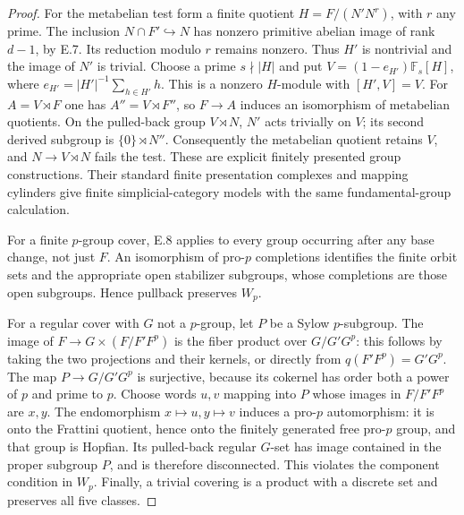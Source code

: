 \begin{proof}
For the metabelian test form a finite quotient
$H=F/(N'N^r)$, with $r$ any prime. The inclusion
$N\cap F'\hookrightarrow N$ has nonzero primitive abelian
image of rank $d-1$, by E.7. Its reduction modulo $r$ remains
nonzero. Thus $H'$ is nontrivial and the image of $N'$ is trivial.
Choose a prime $s\nmid |H|$ and put
$V=(1-e_{H'})\mathbb F_s[H]$, where
$e_{H'}=|H'|^{-1}\sum_{h\in H'}h$. This is a nonzero $H$-module
with $[H',V]=V$. For $A=V\rtimes F$ one has
$A''=V\rtimes F''$, so $F\to A$ induces an isomorphism of
metabelian quotients. On the pulled-back group $V\rtimes N$,
$N'$ acts trivially on $V$; its second derived subgroup is
$\{0\}\rtimes N''$. Consequently the metabelian quotient
retains $V$, and $N\to V\rtimes N$ fails the test. These are
explicit finitely presented group constructions. Their standard
finite presentation complexes and mapping cylinders give finite
simplicial-category models with the same fundamental-group
calculation.

For a finite $p$-group cover, E.8 applies to every group occurring
after any base change, not just $F$. An isomorphism of pro-$p$
completions identifies the finite orbit sets and the appropriate
open stabilizer subgroups, whose completions are those open
subgroups. Hence pullback preserves $W_p$.

For a regular cover with $G$ not a $p$-group, let $P$ be a Sylow
$p$-subgroup. The image of
$F\to G\times(F/F'F^p)$ is the fiber product over
$G/G'G^p$: this follows by taking the two projections and their
kernels, or directly from $q(F'F^p)=G'G^p$.
The map $P\to G/G'G^p$ is surjective, because its cokernel has
order both a power of $p$ and prime to $p$. Choose words $u,v$
mapping into $P$ whose images in $F/F'F^p$ are $x,y$.
The endomorphism $x\mapsto u,y\mapsto v$ induces a pro-$p$
automorphism: it is onto the Frattini quotient, hence onto the
finitely generated free pro-$p$ group, and that group is Hopfian.
Its pulled-back regular $G$-set has image contained in the proper
subgroup $P$, and is therefore disconnected. This violates the
component condition in $W_p$. Finally, a trivial covering is a
product with a discrete set and preserves all five classes.
\end{proof}

